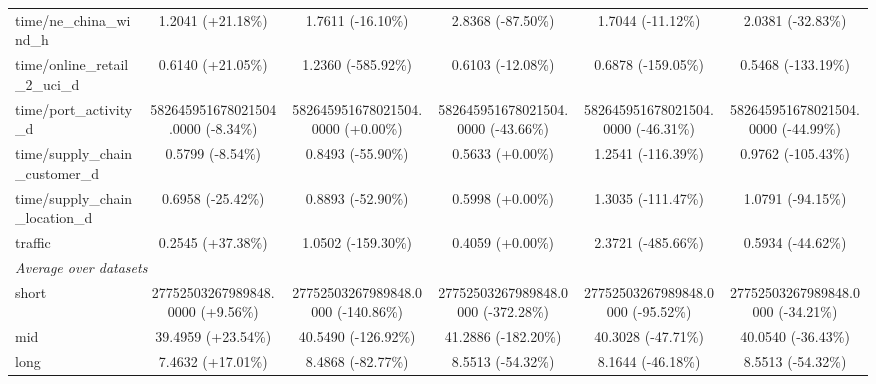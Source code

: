 \begin{table}[htbp]
{\begin{tabular}{lccccc}
time/ne\_china\_wind\_h & 1.2041 (+21.18\%) & 1.7611 (-16.10\%) & 2.8368 (-87.50\%) & 1.7044 (-11.12\%) & 2.0381 (-32.83\%) \\
time/online\_retail\_2\_uci\_d & 0.6140 (+21.05\%) & 1.2360 (-585.92\%) & 0.6103 (-12.08\%) & 0.6878 (-159.05\%) & 0.5468 (-133.19\%) \\
time/port\_activity\_d & 582645951678021504.0000 (-8.34\%) & 582645951678021504.0000 (+0.00\%) & 582645951678021504.0000 (-43.66\%) & 582645951678021504.0000 (-46.31\%) & 582645951678021504.0000 (-44.99\%) \\
time/supply\_chain\_customer\_d & 0.5799 (-8.54\%) & 0.8493 (-55.90\%) & 0.5633 (+0.00\%) & 1.2541 (-116.39\%) & 0.9762 (-105.43\%) \\
time/supply\_chain\_location\_d & 0.6958 (-25.42\%) & 0.8893 (-52.90\%) & 0.5998 (+0.00\%) & 1.3035 (-111.47\%) & 1.0791 (-94.15\%) \\
traffic & 0.2545 (+37.38\%) & 1.0502 (-159.30\%) & 0.4059 (+0.00\%) & 2.3721 (-485.66\%) & 0.5934 (-44.62\%) \\
\midrule
\multicolumn{6}{l}{\textit{Average over datasets}} \\
short & 27752503267989848.0000 (+9.56\%) & 27752503267989848.0000 (-140.86\%) & 27752503267989848.0000 (-372.28\%) & 27752503267989848.0000 (-95.52\%) & 27752503267989848.0000 (-34.21\%) \\
mid & 39.4959 (+23.54\%) & 40.5490 (-126.92\%) & 41.2886 (-182.20\%) & 40.3028 (-47.71\%) & 40.0540 (-36.43\%) \\
long & 7.4632 (+17.01\%) & 8.4868 (-82.77\%) & 8.5513 (-54.32\%) & 8.1644 (-46.18\%) & 8.5513 (-54.32\%) \\
\bottomrule
\end{tabular}%
}
\label{tab:tsfm-nmse-marginals}
\end{table}